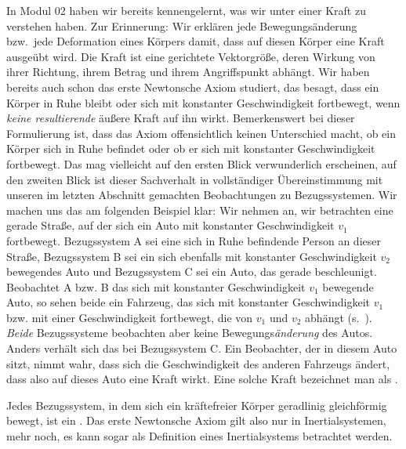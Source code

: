 \begin{MContent}
               
               In Modul 02 haben wir bereits kennengelernt, was wir unter einer Kraft zu verstehen haben. Zur Erinnerung: Wir erkl\"aren jede Bewegungs\"anderung  bzw.~jede Deformation eines
               K\"orpers damit, dass auf diesen K\"orper eine Kraft ausge\"ubt wird. Die Kraft ist eine gerichtete Vektorgr\"o{\ss}e, deren Wirkung von ihrer Richtung, ihrem Betrag und ihrem
               Angriffspunkt abh\"angt. Wir haben bereits auch schon das erste Newtonsche Axiom studiert, das besagt, dass ein K\"orper in Ruhe bleibt oder sich mit konstanter Geschwindigkeit
               fortbewegt, wenn \textit{keine resultierende} \"au{\ss}ere Kraft auf ihn wirkt. Bemerkenswert bei dieser Formulierung ist, dass das  Axiom offensichtlich keinen Unterschied
               macht, ob ein K\"orper sich in Ruhe befindet oder ob er sich mit konstanter Geschwindigkeit fortbewegt. Das mag vielleicht auf den ersten Blick verwunderlich erscheinen, auf
               den zweiten Blick ist dieser Sachverhalt in vollst\"andiger \"Ubereinstimmung mit unseren im letzten Abschnitt gemachten Beobachtungen zu Bezugssystemen. Wir machen uns das am
               folgenden Beispiel klar: Wir nehmen an, wir betrachten eine gerade Stra{\ss}e, auf der sich ein Auto mit konstanter Geschwindigkeit $v_1$ fortbewegt. Bezugssystem A sei eine sich in Ruhe befindende Person an dieser Stra{\ss}e, Bezugssystem B sei ein sich ebenfalls mit konstanter Geschwindigkeit $v_2$ bewegendes Auto und Bezugssystem C sei ein Auto, das gerade
               beschleunigt. Beobachtet A bzw. B das sich mit konstanter Geschwindigkeit $v_1$ bewegende Auto, so sehen beide ein Fahrzeug, das sich mit konstanter Geschwindigkeit
               $v_1$ bzw. mit einer Geschwindigkeit fortbewegt, die von $v_1$ und $v_2$ abh\"angt (s.~).
               \textit{Beide} Bezugssysteme beobachten aber keine Bewegungs\textit{\"anderung} des Autos. \\
               Anders verh\"alt sich das bei Bezugssystem C. Ein Beobachter, der in diesem Auto sitzt, nimmt wahr, dass sich die Geschwindigkeit des anderen Fahrzeugs
               \"andert, dass also auf dieses Auto eine Kraft wirkt. Eine solche Kraft bezeichnet man als .
               
               
                             
               
               \begin{MInfo}
               Jedes Bezugssystem, in dem sich ein kr\"aftefreier K\"orper geradlinig gleichf\"ormig bewegt, ist ein . Das erste Newtonsche Axiom gilt also nur in Inertialsystemen, mehr noch, es kann sogar als Definition eines Inertialsystems betrachtet werden.
               \end{MInfo}
               

\end{MContent}
